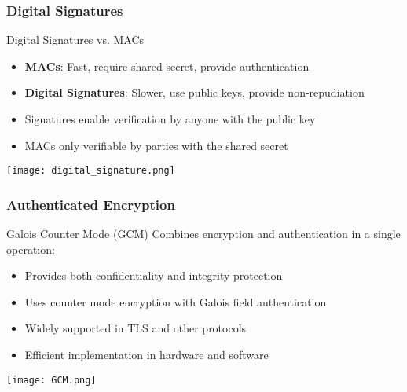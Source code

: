 \subsubsection{Digital Signatures}

\begin{concept}{Digital Signatures vs. MACs}
    \begin{itemize}
        \item \textbf{MACs}: Fast, require shared secret, provide authentication
        \item \textbf{Digital Signatures}: Slower, use public keys, provide non-repudiation
        \item Signatures enable verification by anyone with the public key
        \item MACs only verifiable by parties with the shared secret
    \end{itemize}
    \texttt{[image: digital\_signature.png]}
\end{concept}

\subsubsection{Authenticated Encryption}

\begin{concept}{Galois Counter Mode (GCM)}
    Combines encryption and authentication in a single operation:
    \begin{itemize}
        \item Provides both confidentiality and integrity protection
        \item Uses counter mode encryption with Galois field authentication
        \item Widely supported in TLS and other protocols
        \item Efficient implementation in hardware and software
    \end{itemize}
    \texttt{[image: GCM.png]}
\end{concept}


